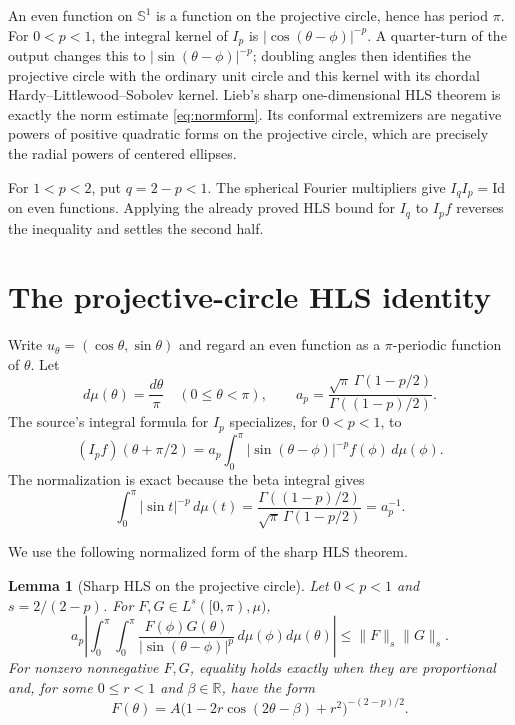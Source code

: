 \documentclass[10pt]{article}
\newtheorem{lemma}[theorem]{Lemma}
\newcommand{\Sph}{\mathbb S}
\newcommand{\R}{\mathbb R}
\begin{document}
An even function on $\Sph^1$ is a function on the projective circle, hence
has period $\pi$.  For $0<p<1$, the integral kernel of $I_p$ is
$|\cos(\theta-\phi)|^{-p}$.  A quarter-turn of the output changes this to
$|\sin(\theta-\phi)|^{-p}$; doubling angles then identifies the projective
circle with the ordinary unit circle and this kernel with its chordal
Hardy--Littlewood--Sobolev kernel.  Lieb's sharp one-dimensional HLS theorem
is exactly the norm estimate \eqref{eq:normform}.  Its conformal extremizers
are negative powers of positive quadratic forms on the projective circle,
which are precisely the radial powers of centered ellipses.

For $1<p<2$, put $q=2-p<1$.  The spherical Fourier multipliers give
$I_qI_p=\mathrm{Id}$ on even functions.  Applying the already proved HLS
bound for $I_q$ to $I_pf$ reverses the inequality and settles the second
half.

\section{The projective-circle HLS identity}

Write $u_\theta=(\cos\theta,\sin\theta)$ and regard an even function as a
$\pi$-periodic function of $\theta$.  Let
\[
 d\mu(\theta)=\frac{d\theta}{\pi}\quad (0\leq\theta<\pi),
 \qquad
 a_p=\frac{\sqrt\pi\,\Gamma(1-p/2)}{\Gamma((1-p)/2)}.
\]
The source's integral formula for $I_p$ specializes, for $0<p<1$, to
\begin{equation}
 (I_pf)(\theta+\pi/2)
 =a_p\int_0^\pi |\sin(\theta-\phi)|^{-p}f(\phi)\,d\mu(\phi).
 \label{eq:kernel}
\end{equation}
The normalization is exact because the beta integral gives
\begin{equation}
 \int_0^\pi |\sin t|^{-p}\,d\mu(t)
 =\frac{\Gamma((1-p)/2)}{\sqrt\pi\,\Gamma(1-p/2)}=a_p^{-1}.
 \label{eq:mass}
\end{equation}

We use the following normalized form of the sharp HLS theorem.

\begin{lemma}[Sharp HLS on the projective circle]\label{lem:hls}
Let $0<p<1$ and $s=2/(2-p)$.  For $F,G\in L^s([0,\pi),\mu)$,
\begin{equation}
 a_p\left|\int_0^\pi\!\int_0^\pi
 \frac{F(\phi)G(\theta)}{|\sin(\theta-\phi)|^p}
 \,d\mu(\phi)d\mu(\theta)\right|
 \leq \|F\|_s\|G\|_s.
 \label{eq:hls}
\end{equation}
For nonzero nonnegative $F,G$, equality holds exactly when they are
proportional and, for some $0\leq r<1$ and $\beta\in\R$, have the form
\begin{equation}
 F(\theta)=A
 \bigl(1-2r\cos(2\theta-\beta)+r^2\bigr)^{-(2-p)/2}.
 \label{eq:extremizer}
\end{equation}
\end{lemma}
\end{document}
